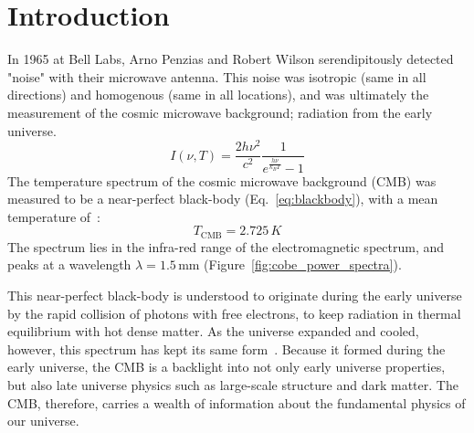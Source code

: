 
\chapter{Introduction} %

\label{ch:intro} %


\newcommand{\keyword}[1]{\textbf{#1}}
\newcommand{\tabhead}[1]{\textbf{#1}}
\newcommand{\code}[1]{\texttt{#1}}
\newcommand{\file}[1]{\texttt{\bfseries#1}}
\newcommand{\option}[1]{\texttt{\itshape#1}}

In 1965 at Bell Labs, Arno Penzias and Robert Wilson serendipitously detected "noise" with their microwave antenna.  This noise was isotropic (same in all directions) and homogenous (same in all locations), and was ultimately the measurement of the cosmic microwave background; radiation from the early universe.
\begin{equation}
    I(\nu,T) = \frac{2h\nu^2}{c^2}\frac{1}{e^{\frac{h\nu}{k_B T}} -1}
    \label{eq:blackbody}
\end{equation}
The temperature spectrum of the cosmic microwave background (CMB) was measured to be a near-perfect black-body (Eq.~\ref{eq:blackbody}), with a mean temperature of~\cite{burke_graham-smith_wilkinson_2019}:
\begin{equation}
    T_{\text{CMB}} = 2.725\,K
\end{equation}
The spectrum lies in the infra-red range of the electromagnetic spectrum, and peaks at a wavelength $\lambda = 1.5\,\text{mm}$ (Figure~\ref{fig:cobe_power_spectra}). 

This near-perfect black-body is understood to originate during the early universe by the rapid collision of photons with free electrons, to keep radiation in thermal equilibrium with hot dense matter.  As the universe expanded and cooled, however, this spectrum has kept its same form~\cite{weinberg_cosmo}.  Because it formed during the early universe, the CMB is a backlight into not only early universe properties, but also late universe physics such as large-scale structure and dark matter.  The CMB, therefore, carries a wealth of information about the fundamental physics of our universe.

